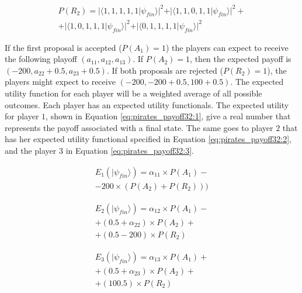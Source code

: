 \begin{equation}
\begin{split}
P(R_{2}) = \vert\langle1,1,1,1,1\vert\psi_{fin}\rangle\vert^{2} + \vert\langle1,1,0,1,1\vert\psi_{fin}\rangle\vert^{2} + \\ 
+ \vert\langle1,0,1,1,1\vert\psi_{fin}\rangle\vert^{2}
+ \vert\langle0,1,1,1,1\vert\psi_{fin}\rangle\vert^{2}
 \end{split}
\end{equation}


If the first proposal is accepted ($P(A_{1})=1$) the players can expect to receive the following playoff $(a_{11}, a_{12}, a_{13})$. If $P(A_{2})=1$, then the expected payoff is $(-200, a_{22}+0.5, a_{23}+0.5)$. If both proposals are rejected ($P(R_{2})= 1$), the players might expect to receive $(-200, -200+0.5, 100+0.5)$. The expected utility function for each player will be a weighted average of all possible outcomes. Each player has an expected utility functionals. The expected utility for player $1$, shown in Equation \ref{eq:pirates_payoff32:1}, give a real number that represents the payoff associated with a final state. The same goes to player $2$ that has her expected utility functional specified in Equation \ref{eq:pirates_payoff32:2}, and the player $3$ in Equation \ref{eq:pirates_payoff32:3}.

 
\begin{equation}
\begin{split}
E_{1}(\vert\psi_{fin}\rangle)=\alpha_{11}\times P(A_{1}) - \\ 
 - 200\times( P(A_{2})  +  P(R_{2}) ) 
 ) 
\end{split}
\label{eq:pirates_payoff32:1}
\end{equation}

\begin{equation}
\begin{split}
E_{2}(\vert\psi_{fin}\rangle)=\alpha_{12}\times P(A_{1}) - \\
 + (0.5 + \alpha_{22})\times P(A_{2})  + \\ 
+(0.5-200)\times P(R_{2})
\end{split}
\label{eq:pirates_payoff32:2}
\end{equation}

\begin{equation}
\begin{split}
E_{3}(\vert\psi_{fin}\rangle)=\alpha_{13}\times P(A_{1}) + \\
 + (0.5 + \alpha_{23})\times P(A_{2})   + \\
 + (100.5)\times P(R_{2}) 
\end{split}
\label{eq:pirates_payoff32:3}
\end{equation}



